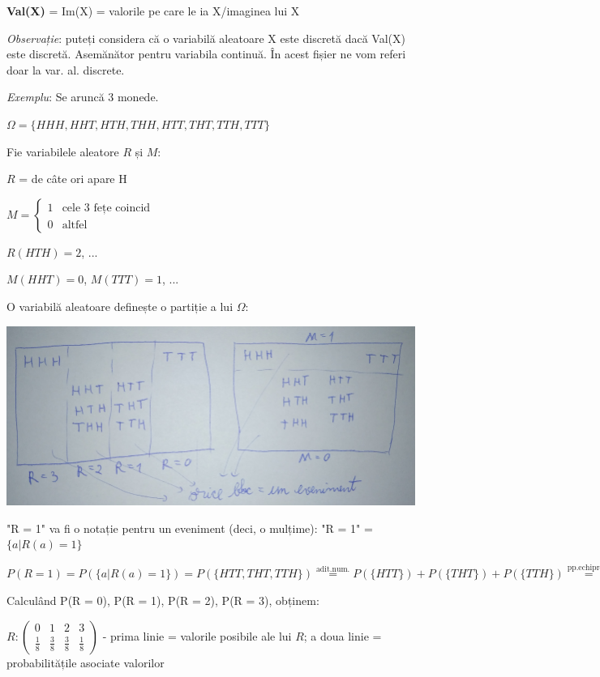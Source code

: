 \documentclass[12pt]{article}
\begin{document}
	\textbf{Val(X)} = Im(X) = valorile pe care le ia X/imaginea lui X
	
	\textit{Observație}: puteți considera că o variabilă aleatoare X este discretă dacă Val(X) este discretă. Asemănător pentru variabila continuă. În acest fișier ne vom referi doar la var. al. discrete.
	
	\textit{Exemplu}: Se aruncă 3 monede.
	
	$\Omega = \{HHH,HHT,HTH,THH,HTT,THT,TTH,TTT\}$
	
	Fie variabilele aleatore $R$ și $M$:
	
	$R$ = de câte ori apare H
	
$M = \begin{cases} 
1 & \text{cele 3 fețe coincid} \\
0 & \text{altfel}
\end{cases}
$
	
	$R(HTH) = 2$, ...
	
	$M(HHT) = 0$, $M(TTT) = 1$, ...
	
	O variabilă aleatoare definește o partiție a lui $\Omega$:
	
	\begin{center}
		\includegraphics[width=\linewidth]{screenshot007}
	\end{center}
	
	
	"R = 1" va fi o notație pentru un eveniment (deci, o mulțime): "R = 1" = $\{a | R(a) = 1\}$
	
	$P(R = 1) = P(\{a | R(a) = 1\}) = P(\{HTT,THT,TTH\}) \stackrel{\text{adit.num.}}{=} P(\{HTT\}) + P(\{THT\}) + P(\{TTH\}) \stackrel{\text{pp.echiprob.}}{=}\frac{3}{8}$
	
	Calculând P(R = 0), P(R = 1), P(R = 2), P(R = 3), obținem:
	
	$R: \begin{pmatrix}
	0 &1& 2& 3\\
	\frac{1}{8} & \frac{3}{8} & \frac{3}{8} & \frac{1}{8}
	\end{pmatrix}$ - prima linie = valorile posibile ale lui $R$; a doua linie = probabilitățile asociate valorilor
	
\end{document}

